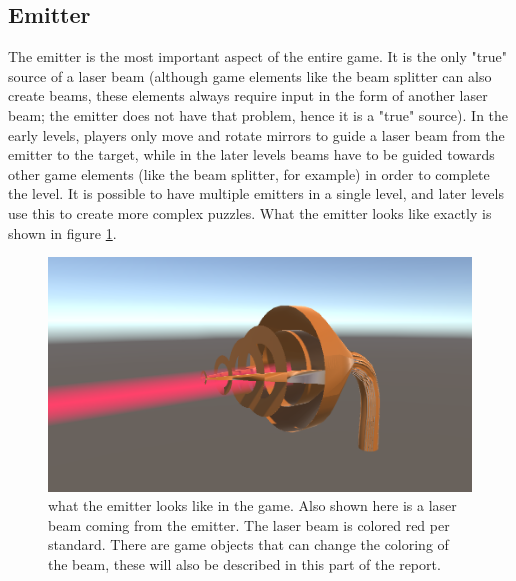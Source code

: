		\subsection{Emitter} \label{ssec:emitter}
			The emitter is the most important aspect of the entire game.
			It is the only "true" source of a laser beam (although game
			elements like the beam splitter can also create beams, these
			elements always require input in the form of another laser
			beam; the emitter does not have that problem, hence it is a "true"
			source). In the early levels, players only move and rotate mirrors
			to guide a laser beam from the emitter to the target, while in the
			later levels beams have to be guided towards other game elements
			(like the beam splitter, for example) in order to complete the
			level. It is possible to have multiple emitters in a single level,
			and later levels use this to create more complex puzzles.
			What the emitter looks like exactly is shown in figure 
			\ref{fig:emitter}.
			\begin{figure}[h!]
				\centering
				\includegraphics[scale = 0.25]{Emitter}
				\caption{what the emitter looks like in the game. Also shown here is a laser beam
				coming from the emitter. The laser beam is colored red per standard. There are game objects that can change the coloring of the beam, these will also be described in this part of the report.}
				\label{fig:emitter}
			\end{figure}
			
